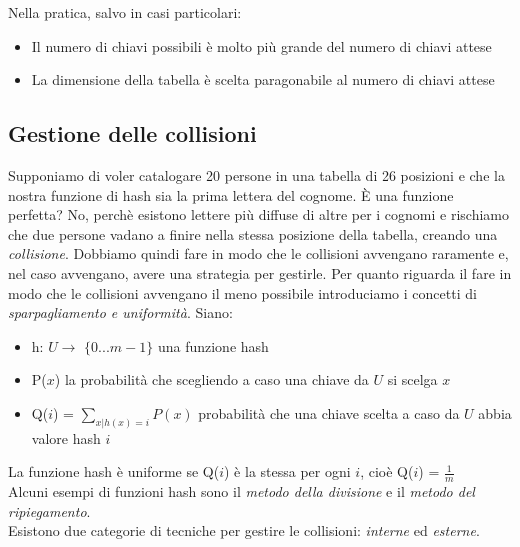 \noindent Nella pratica, salvo in casi particolari:
\begin{itemize}
    \item Il numero di chiavi possibili è molto più grande del numero di chiavi attese
    \item La dimensione della tabella è scelta paragonabile al numero di chiavi attese
\end{itemize}

\subsection{Gestione delle collisioni}
Supponiamo di voler catalogare 20 persone in una tabella di 26 posizioni e che la nostra
funzione di hash sia la prima lettera del cognome. È una funzione perfetta? No,
perchè esistono lettere più diffuse di altre per i cognomi e rischiamo che due persone vadano a finire nella 
stessa posizione della tabella, creando una \emph{collisione}.
Dobbiamo quindi fare in modo che le collisioni avvengano raramente e, nel caso avvengano,
avere una strategia per gestirle.
Per quanto riguarda il fare in modo che le collisioni avvengano il meno possibile introduciamo i
concetti di \emph{sparpagliamento e uniformità}.
Siano:
\begin{itemize}
    \item h: $U \rightarrow$ $\lbrace 0 ... m-1\rbrace$ una funzione hash
    \item P($x$) la probabilità che scegliendo a caso una chiave da $U$ si scelga $x$
    \item Q($i$) = $\sum_{x | h(x) = i} P(x)$ probabilità che una chiave scelta a caso da $U$
    abbia valore hash $i$
\end{itemize}

\noindent La funzione hash è uniforme se Q($i$) è la stessa per ogni $i$, cioè Q($i$) = $\frac{1}{m}$\\
Alcuni esempi di funzioni hash sono il \emph{metodo della divisione} e il \emph{metodo del ripiegamento}.\\
Esistono due categorie di tecniche per gestire le collisioni: \emph{interne} ed \emph{esterne}.
